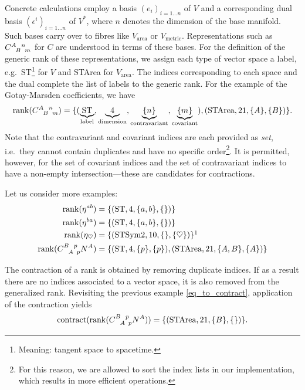 Concrete calculations employ a basis $(e_i)_{i=1\dots n}$ of $V$ and a corresponding dual basis $(\epsilon^i)_{i=1\dots n}$ of $V^\ast$, where $n$ denotes the dimension of the base manifold. Such bases carry over to fibres like $V_\text{area}$ or $V_\text{metric}$. Representations such as $\gmc{A}{B}{n}{m}$ for $C$ are understood in terms of these bases. For the definition of the generic rank of these representations, we assign each type of vector space a label, e.g.\ ST\footnote{Meaning: tangent space to spacetime.} for $V$ and STArea for $V_\text{area}$. The indices corresponding to each space and the dual complete the list of labels to the generic rank. For the example of the Gotay-Marsden coefficients, we have
\begin{equation}
  \operatorname{rank}(\gmc{A}{B}{n}{m}) = \{(\underbrace{\text{ST}}_{\text{label}}, \underbrace{4}_{\text{dimension}}, \underbrace{\{n\}}_{\text{contravariant}}, \underbrace{\{m\}}_{\text{covariant}}), (\text{STArea}, 21, \{A\}, \{B\})\}.
\end{equation}
Note that the contravariant and covariant indices are each provided as \emph{set}, i.e.\ they cannot contain duplicates and have no specific order\footnote{For this reason, we are allowed to sort the index lists in our implementation, which results in more efficient operations.}. It is permitted, however, for the set of covariant indices and the set of contravariant indices to have a non-empty intersection---these are candidates for contractions.

Let us consider more examples:
\begin{align}
  \operatorname{rank}(\eta^{ab}) = {} & \{(\text{ST}, 4, \{a,b\}, \{\})\} \\
  \operatorname{rank}(\eta^{ba}) = {} & \{(\text{ST}, 4, \{a,b\}, \{\})\} \\
  \operatorname{rank}(\eta_{\heartsuit}) = {} & \{(\text{STSym2}, 10, \{\}, \{\heartsuit\})\}\footnotemark \\
  \operatorname{rank}(\gmc{B}{A}{p}{p} N^A) = {} & \{(\text{ST}, 4, \{p\}, \{p\}), (\text{STArea}, 21, \{A,B\}, \{A\})\} \label{eq_to_contract}
\end{align}

The contraction of a rank is obtained by removing duplicate indices. If as a result there are no indices associated to a vector space, it is also removed from the generalized rank. Revisiting the previous example \eqref{eq_to_contract}, application of the contraction yields
\begin{equation}
  \operatorname{contract}(\operatorname{rank}(\gmc{B}{A}{p}{p} N^A)) = \{(\text{STArea}, 21, \{B\}, \{\})\}.
\end{equation}

